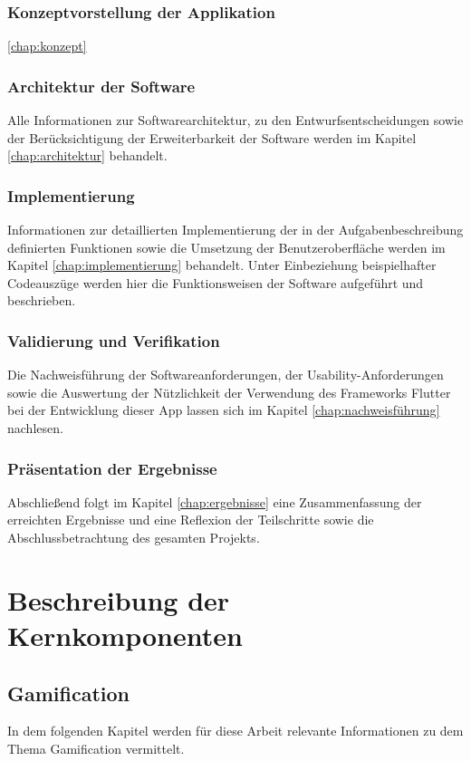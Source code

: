 \documentclass[bibliography=totoc,listof=totoc,BCOR=5mm,DIV=12,oneside]{scrbook}
\begin{document}
\subsection{Konzeptvorstellung der Applikation}
\par \ref{chap:konzept}


\subsection{Architektur der Software}
\par Alle Informationen zur Softwarearchitektur, zu den Entwurfsentscheidungen sowie der Berücksichtigung der Erweiterbarkeit der Software werden im Kapitel \ref{chap:architektur}  behandelt.

\subsection{Implementierung}
Informationen zur detaillierten Implementierung der in der Aufgabenbeschreibung definierten Funktionen sowie die Umsetzung der Benutzeroberfläche werden im Kapitel \ref{chap:implementierung} behandelt. Unter Einbeziehung beispielhafter Codeauszüge werden hier die Funktionsweisen der Software aufgeführt und beschrieben.

\subsection{Validierung und Verifikation}
Die Nachweisführung der Softwareanforderungen, der Usability-Anforderungen sowie die Auswertung der Nützlichkeit der Verwendung des Frameworks Flutter bei der Entwicklung dieser App lassen sich im Kapitel \ref{chap:nachweisführung} nachlesen.

\subsection{Präsentation der Ergebnisse}
Abschließend folgt im Kapitel \ref{chap:ergebnisse} eine Zusammenfassung der erreichten Ergebnisse und eine Reflexion der Teilschritte sowie die Abschlussbetrachtung des gesamten Projekts.

\chapter{Beschreibung der Kernkomponenten} 
\label{chap:grundlagenkapitel}
\section{Gamification} 
\label{sec:grundlagenkapitelGamification}
\par In dem folgenden Kapitel werden für diese Arbeit relevante Informationen zu dem Thema Gamification vermittelt. 
\end{document}
